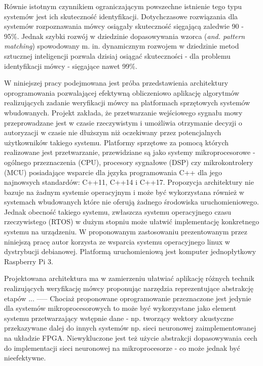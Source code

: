 Równie istotnym czynnikiem ograniczającym powszechne istnienie tego typu systemów jest ich skuteczność identyfikacji. Dotychczasowe rozwiązania dla systemów rozpoznawania mówcy osiągały skuteczność sięgającą zaledwie 90 - 95\%. Jednak szybki rozwój w dziedzinie dopasowywania wzorca (\textit{and. pattern matching}) spowodowany m. in. dynamicznym rozwojem w dziedzinie metod sztucznej inteligencji pozwala dzisiaj osiągać skuteczności - dla problemu identyfikacji mówcy - sięgające nawet 99\%. %

W niniejszej pracy podejmowana jest próba przedstawienia architektury oprogramowania pozwalającej efektywną obliczeniowo aplikację algorytmów realizujących zadanie weryfikacji mówcy na platformach sprzętowych systemów wbudowanych. Projekt zakłada, że przetwarzanie wejściowego sygnału mowy przeprowadzane jest w czasie rzeczywistym i umożliwia otrzymanie decyzji o autoryzacji w czasie nie dłuższym niż oczekiwany przez potencjalnych użytkowników takiego systemu. Platformy sprzętowe za pomocą których realizowane jest przetwarzanie, przewidziane są jako systemy mikroprocesorowe - ogólnego przeznaczenia (CPU), procesory sygnałowe (DSP) czy mikrokontrolery (MCU) posiadające wsparcie dla języka programowania C++ dla jego najnowsych standardów: C++11, C++14 i C++17. Propozycja architektury nie bazuje na żadnym systemie operacyjnym i może być wykorzystana również w systemach wbudowanych które nie oferują żadnego środowiska uruchomieniowego. Jednak obecność takiego systemu, zwłaszcza systemu operacyjnego czasu rzeczywistego (RTOS) w dużym stopniu może ułatwić implementację konkretnego systemu na urządzeniu. W proponowanym zastosowaniu prezentowanym przez niniejszą pracę autor korzysta ze wsparcia systemu operacyjnego linux w dystrybucji debianowej. Platformą uruchomieniową jest komputer jednopłytkowy Raspberry Pi 3.

Projektowana architektura ma w zamierzeniu ułatwiać aplikację różnych technik realizujących weryfikację mówcy proponując narzędzia reprezentujące abstrakcję etapów  ... %
----- Chociaż proponowane oprogramowanie przeznaczone jest jedynie dla systemów mikroprocesorowych to może być wykorzystane jako element systemu przetwarzający wstępnie dane - np. tworzący wektory akustyczne przekazywane dalej do innych systemów np. sieci neuronowej zaimplementowanej na układzie FPGA. Niewykluczone jest też użycie abstrakcji dopasowywania cech do implementacji sieci neuronowej na mikroprocesorze - co może jednak być nieefektywne. %


